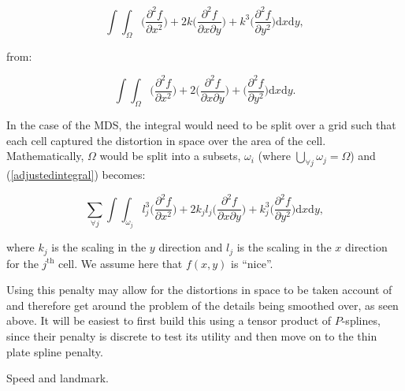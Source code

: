 \documentclass[a4paper,10pt]{article}
\begin{document}
\begin{equation}
\int\int_\Omega \Big( \frac{\partial^2 f}{\partial x^2} \Big) + 2k\Big( \frac{\partial^2 f}{\partial x \partial y} \Big) + k^3\Big( \frac{\partial^2 f}{\partial y^2} \Big) \text{d}x \text{d}y,
\label{adjustedintegral}
\end{equation}

from:

\begin{equation*}
\int\int_\Omega \Big( \frac{\partial^2 f}{\partial x^2} \Big) + 2\Big( \frac{\partial^2 f}{\partial x \partial y} \Big) + \Big( \frac{\partial^2 f}{\partial y^2} \Big) \text{d}x \text{d}y.
\end{equation*}

In the case of the MDS, the integral would need to be split over a grid such that each cell captured the distortion in space over the area of the cell. Mathematically, $\Omega$ would be split into a subsets, $\omega_i$ (where $\bigcup_{\forall j} \omega_j = \Omega$) and (\ref{adjustedintegral}) becomes:

\begin{equation}
\sum_{\forall j} \int\int_{\omega_j} l_j^3 \Big( \frac{\partial^2 f}{\partial x^2} \Big) + 2k_jl_j\Big( \frac{\partial^2 f}{\partial x \partial y} \Big) + k_j^3\Big( \frac{\partial^2 f}{\partial y^2} \Big) \text{d}x \text{d}y,
\label{adjustedintegral}
\end{equation}

where $k_j$ is the scaling in the $y$ direction and $l_j$ is the scaling in the $x$ direction for the $j^{\text{th}}$ cell. We assume here that $f(x,y)$ is ``nice''.

Using this penalty may allow for the distortions in space to be taken account of and therefore get around the problem of the details being smoothed over, as seen above. It will be easiest to first build this using a tensor product of $P$-splines, since their penalty is discrete to test its utility and then move on to the thin plate spline penalty.

Speed and landmark.






\end{document}
